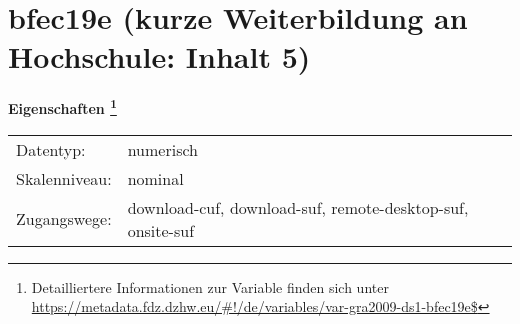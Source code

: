 
    \setcounter{footnote}{0}

    \vspace*{-1.8cm}
	\section{bfec19e (kurze Weiterbildung an Hochschule: Inhalt 5)}
	\label{section:bfec19e}



    \vspace*{0.5cm}
    \noindent\textbf{Eigenschaften
	\footnote{Detailliertere Informationen zur Variable finden sich unter
		\url{https://metadata.fdz.dzhw.eu/\#!/de/variables/var-gra2009-ds1-bfec19e$}}}\\
	\begin{tabularx}{\hsize}{@{}lX}
	Datentyp: & numerisch \\
	Skalenniveau: & nominal \\
	Zugangswege: &
	  download-cuf, 
	  download-suf, 
	  remote-desktop-suf, 
	  onsite-suf
 \\
    \end{tabularx}



